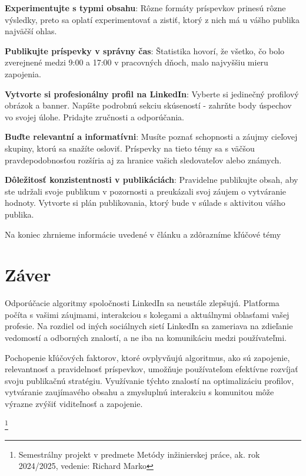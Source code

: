 \documentclass[slovak,a4paper]{coursepaper}
\begin{document}
\textbf{Experimentujte s typmi obsahu}: Rôzne formáty príspevkov prinesú rôzne výsledky, preto sa oplatí experimentovať a zistiť, ktorý z nich má u vášho publika najväčší ohlas.

\textbf{Publikujte príspevky v správny čas}:
Štatistika hovorí, že všetko, čo bolo zverejnené medzi 9:00 a 17:00 v pracovných dňoch, malo najvyššiu mieru zapojenia.~\cite{11}

\textbf{Vytvorte si profesionálny profil na LinkedIn}: Vyberte si jedinečný profilový obrázok a banner. Napíšte podrobnú sekciu skúseností - zahrňte body úspechov vo svojej úlohe.
Pridajte zručnosti a odporúčania.

\textbf{Buďte relevantní a informatívni}: Musíte poznať schopnosti a záujmy cieľovej skupiny, ktorú sa snažíte osloviť. Príspevky na tieto témy sa s väčšou pravdepodobnosťou rozšíria aj za hranice vašich sledovateľov alebo známych.

\textbf{Dôležitosť konzistentnosti v publikáciách}: Pravidelne publikujte obsah, aby ste udržali svoje publikum v pozornosti a preukázali svoj záujem o vytváranie hodnoty. Vytvorte si plán publikovania, ktorý bude v súlade s aktivitou vášho publika.\cite{12}

Na koniec zhrnieme informácie uvedené v článku a zdôrazníme kľúčové témy

\section{Záver} \label{zaver}
Odporúčacie algoritmy spoločnosti LinkedIn sa neustále zlepšujú. Platforma počíta s vašimi záujmami, interakciou s kolegami a aktuálnymi oblasťami vašej profesie. Na rozdiel od iných sociálnych sietí LinkedIn sa zameriava na zdieľanie vedomostí a odborných znalostí, a ne iba na komunikáciu medzi používateľmi.

Pochopenie kľúčových faktorov, ktoré ovplyvňujú algoritmus, ako sú zapojenie, relevantnosť a pravidelnosť príspevkov, umožňuje používateľom efektívne rozvíjať svoju publikačnú stratégiu. Využívanie týchto znalostí na optimalizáciu profilov, vytváranie zaujímavého obsahu a zmysluplnú interakciu s komunitou môže výrazne zvýšiť viditeľnosť a zapojenie.

\thanks{Semestrálny projekt v predmete Metódy inžinierskej práce, ak. rok 2024/2025, vedenie: Richard Marko}



\end{document}
